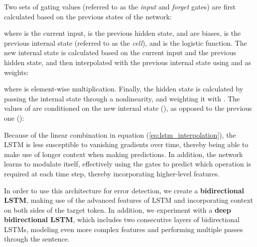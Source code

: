 \documentclass[11pt]{article}
\begin{document}
Two sets of gating values (referred to as the \textit{input} and \textit{forget} gates) are first calculated based on the previous states of the network:



\noindent where  is the current input,  is the previous hidden state,  and  are biases,  is the previous internal state (referred to as the \textit{cell}), and  is the logistic function.
The new internal state is calculated based on the current input and the previous hidden state, and then interpolated with the previous internal state using  and 
 as weights:



\noindent where  is element-wise multiplication.
Finally, the hidden state is calculated by passing the internal state through a  nonlinearity, and weighting it with . The values of  are conditioned on the new internal state (), as opposed to the previous one ():




Because of the linear combination in equation (\ref{eq:lstm_interpolation}), the LSTM is less susceptible to vanishing gradients over time, thereby being able to make use of longer context when making predictions. In addition, the network learns to modulate itself, effectively using the gates to predict which operation is required at each time step, thereby incorporating higher-level features.

In order to use this architecture for error detection, we create a \textbf{bidirectional LSTM}, making use of the advanced features of LSTM and incorporating context on both sides of the target token. In addition, we experiment with a \textbf{deep bidirectional LSTM}, which includes two consecutive layers of bidirectional LSTMs, modeling even more complex features and performing multiple passes through the sentence.
\end{document}
